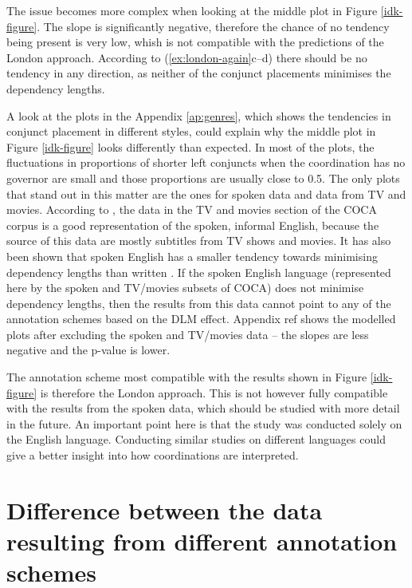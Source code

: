 The issue becomes more complex when looking at the middle plot in Figure \ref{idk-figure}. The slope is significantly negative, therefore the chance of no tendency being present is very low, whish is not compatible with the predictions of the London approach. According to (\ref{ex:london-again}c--d) there should be no tendency in any direction, as neither of the conjunct placements minimises the dependency lengths. 

A look at the plots in the Appendix \ref{ap:genres}, which shows the tendencies in conjunct placement in different styles, could explain why the middle plot in Figure \ref{idk-figure} looks differently than expected. In most of the plots, the fluctuations in proportions of shorter left conjuncts when the coordination has no governor are small and those proportions are usually close to 0.5. The only plots that stand out in this matter are the ones for spoken data and data from TV and movies. According to \cite{davies-tvm}, the data in the TV and movies section of the COCA corpus is a good representation of the spoken, informal English, because the source of this data are mostly subtitles from TV shows and movies. It has also been shown that spoken English has a smaller tendency towards minimising dependency lengths than written \citep{liu-2019-comparative}. If the spoken English language (represented here by the spoken and TV/movies subsets of COCA) does not minimise dependency lengths, then the results from this data cannot point to any of the annotation schemes based on the DLM effect. Appendix ref shows the modelled plots after excluding the spoken and TV/movies data -- the slopes are less negative and the p-value is lower. 

The annotation scheme most compatible with the results shown in Figure \ref{idk-figure} is therefore the London approach. This is not however fully compatible with the results from the spoken data, which should be studied with more detail in the future. An important point here is that the study was conducted solely on the English language. Conducting similar studies on different languages could give a better insight into how coordinations are interpreted. 

\section{Difference between the data resulting from different annotation schemes}


